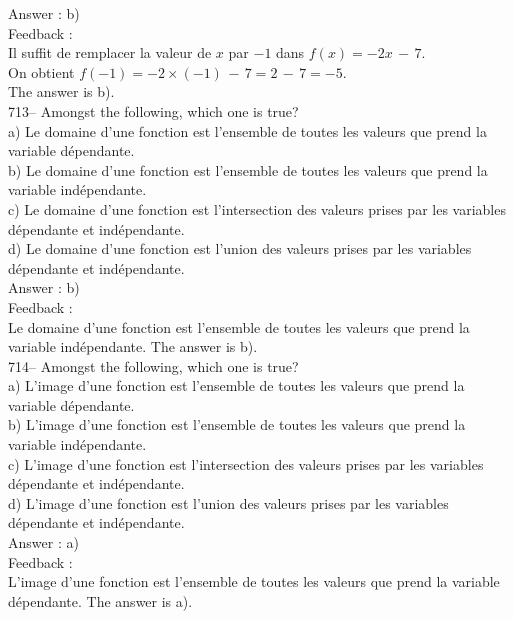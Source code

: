 \documentclass[letterpaper, 12pt]{article}
\begin{document}
Answer : b)\\

Feedback : \\
Il suffit de remplacer la valeur de $x$ par $-1$ dans $f(x)=-2x\,-\,7$.\\
On obtient $f(-1)=-2\times(-1)\,-\,7=2\,-\,7=-5$.\\
The answer is b).\\

713--  Amongst the following, which one is true?\\
a) Le domaine d'une fonction est l'ensemble de toutes les valeurs que prend
la variable d\'ependante.\\
b) Le domaine d'une fonction est l'ensemble de toutes les valeurs que prend
la variable ind\'ependante.\\
c) Le domaine d'une fonction est l'intersection des valeurs prises par les
variables d\'ependante et ind\'ependante.\\
d) Le domaine d'une fonction est l'union des valeurs prises par les
variables d\'ependante et ind\'ependante.\\

Answer : b)\\

Feedback : \\
Le domaine d'une fonction est l'ensemble de toutes les valeurs que prend la
variable ind\'ependante.  The answer is b).\\

714--  Amongst the following, which one is true?\\
a) L'image d'une fonction est l'ensemble de toutes les valeurs que prend la
variable d\'ependante.\\
b) L'image d'une fonction est l'ensemble de toutes les valeurs que prend la
variable ind\'ependante.\\
c) L'image d'une fonction est l'intersection des valeurs prises par les
variables d\'ependante et ind\'ependante.\\
d) L'image d'une fonction est l'union des valeurs prises par les variables
d\'ependante et ind\'ependante.\\

Answer : a)\\

Feedback : \\
L'image d'une fonction est l'ensemble de toutes les valeurs que prend la
variable d\'ependante.  The answer is a).\\
\end{document}
